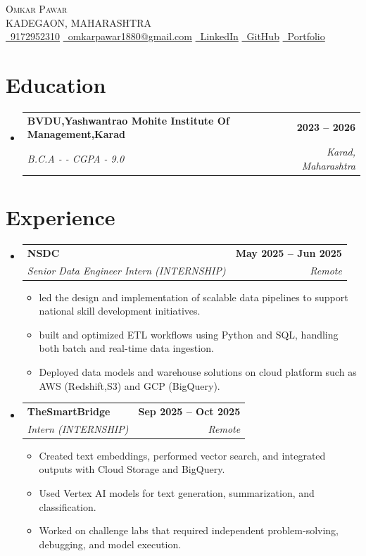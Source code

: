 \documentclass[letterpaper,11pt]{article}
\makeatletter
\newcommand{\resumeItem}[1]{
  \item\small{#1}
}
\newcommand{\resumeSubHeadingListStart}{\begin{itemize}[label={}]}
\newcommand{\resumeSubHeadingListEnd}{\end{itemize}}
\newcommand{\resumeItemListStart}{\begin{itemize}}
\newcommand{\resumeItemListEnd}{\end{itemize}}
\newcommand{\resumeSubheading}[4]{
  \item
  \begin{tabular*}{\textwidth}{l@{\extracolsep{\fill}}r}
    \textbf{#1} & \textbf{#2} \\
    \textit{#3} & \textit{#4}
  \end{tabular*}
}
\makeatother
\begin{document}
\begin{center}
  {\Huge \scshape Omkar Pawar} \\[2pt]
  KADEGAON, MAHARASHTRA \\[6pt]

  \small
  \href{tel:9172952310}{\faPhone\ 9172952310}
  \quad
  \href{mailto:omkarpawar1880@gmail.com}{\faEnvelope\ omkarpawar1880@gmail.com}
  \quad
  \href{ https://www.linkedin.com/in/omkar-pawar/ }{\faLinkedin\ LinkedIn}
  \quad
  \href{ https://github.com/omkarpawar }{\faGithub\ GitHub}
  \quad
  \href{ https://omkarpawar.dev }{\faGlobe\ Portfolio}
\end{center}


\section{Education}
\resumeSubHeadingListStart
\resumeSubheading{BVDU,Yashwantrao Mohite Institute Of Management,Karad}{2023 -- 2026}{B.C.A -  - CGPA - 9.0}{Karad, Maharashtra}

\resumeSubHeadingListEnd

\section{Experience}
\resumeSubHeadingListStart
\resumeSubheading{NSDC}{May 2025 -- Jun 2025}{Senior Data Engineer Intern (INTERNSHIP)}{Remote}
\resumeItemListStart
\resumeItem{led the design and implementation of scalable data pipelines to support national skill development initiatives.}
\resumeItem{built and optimized ETL workflows using Python and SQL, handling both batch and real-time data ingestion.}
\resumeItem{Deployed data models and warehouse solutions on cloud platform such as AWS (Redshift,S3) and GCP (BigQuery).}
\resumeItemListEnd
\resumeSubheading{TheSmartBridge}{Sep 2025 -- Oct 2025}{Intern (INTERNSHIP)}{Remote}
\resumeItemListStart
\resumeItem{Created text embeddings, performed vector search, and integrated outputs with Cloud Storage and BigQuery.}
\resumeItem{Used Vertex AI models for text generation, summarization, and classification.}
\resumeItem{Worked on challenge labs that required independent problem-solving, debugging, and model execution.}
\resumeItemListEnd

\resumeSubHeadingListEnd


\end{document}
